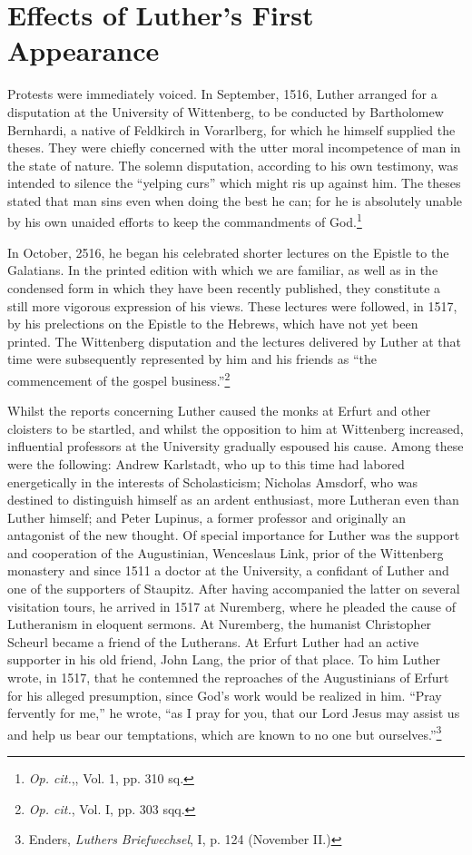 \section{Effects of Luther’s First Appearance}

Protests were immediately voiced. In September, 1516, Luther
arranged for a disputation at the University of Wittenberg, to be
conducted by Bartholomew Bernhardi, a native of Feldkirch in
Vorarlberg, for which he himself supplied the theses. They were
chiefly concerned with the utter moral incompetence of man in the
state of nature. The solemn disputation, according to his own testimony,
was intended to silence the “yelping curs” which might ris up against him.
The theses stated that man sins even when doing the best he can;
for he is absolutely unable by his own unaided efforts to keep the commandments of God.\footnote
{\textit{Op. cit.},, Vol. 1, pp. 310 sq.}

In October, 2516, he began his celebrated shorter lectures on the
Epistle to the Galatians. In the printed edition with which we are
familiar, as well as in the condensed form in which they have been
recently published, they constitute a still more vigorous expression of
his views. These lectures were followed, in 1517, by his prelections on
the Epistle to the Hebrews, which have not yet been printed. The
Wittenberg disputation and the lectures delivered by Luther at that
time were subsequently represented by him and his friends as “the
commencement of the gospel business.”\footnote{\textit{Op. cit.}, Vol. I, pp. 303 sqq.}

Whilst the reports concerning Luther caused the monks at Erfurt
and other cloisters to be startled, and whilst the opposition to him
at Wittenberg increased, influential professors at the University
gradually espoused his cause. Among these were the following:
Andrew Karlstadt, who up to this time had labored energetically in
the interests of Scholasticism; Nicholas Amsdorf, who was destined
to distinguish himself as an ardent enthusiast, more Lutheran even
than Luther himself; and Peter Lupinus, a former professor and
originally an antagonist of the new thought. Of special importance
for Luther was the support and cooperation of the Augustinian,
Wenceslaus Link, prior of the Wittenberg monastery and since 1511
a doctor at the University, a confidant of Luther and one of the
supporters of Staupitz. After having accompanied the latter on several
visitation tours, he arrived in 1517 at Nuremberg, where he pleaded
the cause of Lutheranism in eloquent sermons. At Nuremberg, the
humanist Christopher Scheurl became a friend of the Lutherans.
At Erfurt Luther had an active supporter in his old friend, John
Lang, the prior of that place. To him Luther wrote, in 1517, that he
contemned the reproaches of the Augustinians of Erfurt for his alleged
presumption, since God’s work would be realized in him. “Pray
fervently for me,” he wrote, “as I pray for you, that our Lord Jesus
may assist us and help us bear our temptations, which are known
to no one but ourselves.”\footnote{Enders, \textit{Luthers Briefwechsel}, I, p. 124 (November II.)}

